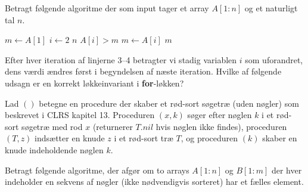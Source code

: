 Betragt følgende algoritme der som input tager et array $A[1\!:\!n]$ og et naturligt tal $n$.
\begin{codebox}
\li $m \gets A[1]$
\li \For $i \gets 2$ \To $n$
\li \Do \If $A[i] > m$
\li \Then $m \gets A[i]$\End\End
\li \Return $m$
\end{codebox}
Efter hver iteration af linjerne 3--4 betragter vi stadig variablen $i$ som uforandret, dens værdi ændres først i begyndelsen af næste iteration.
Hvilke af følgende udsagn er en korrekt løkkeinvariant i \textbf{for}-løkken?
\fleresvar
\mulighederstart
{}
\korrekt
{}\korrekt
{}\korrekt
{}
\mulighederslut
{}



Lad $()$ betegne en procedure der skaber et rød-sort søgetræ (uden nøgler) som beskrevet i CLRS kapitel 13.
Proceduren $(x,k)$ søger efter nøglen $k$ i et rød-sort søgetræ med rod $x$ (returnerer $T.nil$ hvis nøglen ikke findes), proceduren $(T,z)$ indsætter en knude $z$ i et rød-sort træ $T$, og proceduren $(k)$ skaber en knude indeholdende nøglen $k$.

Betragt følgende algoritme, der afgør om to arrays $A[1\!:\!n]$ og $B[1\!:\!m]$ der hver indeholder en sekvens af nøgler (ikke nødvendigvis sorteret) har et fælles element.

